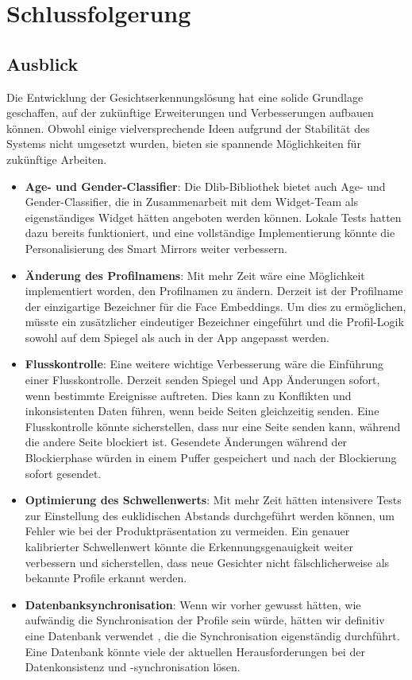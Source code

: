 \section{Schlussfolgerung}



\subsection{Ausblick}
Die Entwicklung der Gesichtserkennungslösung hat eine solide Grundlage geschaffen, auf der zukünftige Erweiterungen und Verbesserungen aufbauen können. Obwohl einige vielversprechende Ideen aufgrund der Stabilität des Systems nicht umgesetzt wurden, bieten sie spannende Möglichkeiten für zukünftige Arbeiten.

\begin{itemize}
    \item \textbf{Age- und Gender-Classifier}: Die Dlib-Bibliothek bietet auch Age- und Gender-Classifier, die in Zusammenarbeit mit dem Widget-Team als eigenständiges Widget hätten angeboten werden können. Lokale Tests hatten dazu bereits funktioniert, und eine vollständige Implementierung könnte die Personalisierung des Smart Mirrors weiter verbessern.
    
    \item \textbf{Änderung des Profilnamens}: Mit mehr Zeit wäre eine Möglichkeit implementiert worden, den Profilnamen zu ändern. Derzeit ist der Profilname der einzigartige Bezeichner für die Face Embeddings. Um dies zu ermöglichen, müsste ein zusätzlicher eindeutiger Bezeichner eingeführt und die Profil-Logik sowohl auf dem Spiegel als auch in der App angepasst werden.
    
    \item \textbf{Flusskontrolle}: Eine weitere wichtige Verbesserung wäre die Einführung einer Flusskontrolle. Derzeit senden Spiegel und App Änderungen sofort, wenn bestimmte Ereignisse auftreten. Dies kann zu Konflikten und inkonsistenten Daten führen, wenn beide Seiten gleichzeitig senden. Eine Flusskontrolle könnte sicherstellen, dass nur eine Seite senden kann, während die andere Seite blockiert ist. Gesendete Änderungen während der Blockierphase würden in einem Puffer gespeichert und nach der Blockierung sofort gesendet.
    
    \item \textbf{Optimierung des Schwellenwerts}: Mit mehr Zeit hätten intensivere Tests zur Einstellung des euklidischen Abstands durchgeführt werden können, um Fehler wie bei der Produktpräsentation zu vermeiden. Ein genauer kalibrierter Schwellenwert könnte die Erkennungsgenauigkeit weiter verbessern und sicherstellen, dass neue Gesichter nicht fälschlicherweise als bekannte Profile erkannt werden.
    
    \item \textbf{Datenbanksynchronisation}: Wenn wir vorher gewusst hätten, wie aufwändig die Synchronisation der Profile sein würde, hätten wir definitiv eine Datenbank verwendet , die die Synchronisation eigenständig durchführt. Eine Datenbank könnte viele der aktuellen Herausforderungen bei der Datenkonsistenz und -synchronisation lösen.
\end{itemize}


